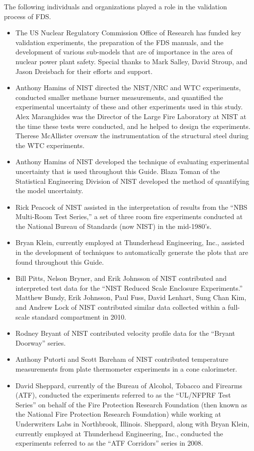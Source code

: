 \documentclass[11pt]{book}
\begin{document}
The following individuals and organizations played a role in the validation process of FDS.
\begin{itemize}
\item The US Nuclear Regulatory Commission Office of Research has funded key validation experiments, the preparation of the FDS manuals, and the development of various sub-models that are of importance in the area of nuclear power plant safety. Special thanks to Mark Salley, David Stroup, and Jason Dreisbach for their efforts and support.
\item Anthony Hamins of NIST directed the NIST/NRC and WTC experiments, conducted smaller methane burner measurements, and quantified the experimental uncertainty of these and other experiments used in this study. Alex Maranghides was the Director of the Large Fire Laboratory at NIST at the time these tests were conducted, and he helped to design the experiments. Therese McAllister oversaw the instrumentation of the structural steel during the WTC experiments.
\item Anthony Hamins of NIST developed the technique of evaluating experimental uncertainty that is used throughout this Guide. Blaza Toman of the Statistical Engineering Division of NIST developed the method of quantifying the model uncertainty.
\item Rick Peacock of NIST assisted in the interpretation of results from the ``NBS Multi-Room Test Series,'' a set of three room fire experiments conducted at the National Bureau of Standards (now NIST) in the mid-1980's.
\item Bryan Klein, currently employed at Thunderhead Engineering, Inc., assisted in the development of techniques to automatically generate the plots that are found throughout this Guide.
\item Bill Pitts, Nelson Bryner, and Erik Johnsson of NIST contributed and interpreted test data for the ``NIST Reduced Scale Enclosure Experiments.'' Matthew Bundy, Erik Johnsson, Paul Fuss, David Lenhart, Sung Chan Kim, and Andrew Lock of NIST contributed similar data collected within a full-scale standard compartment in 2010.
\item Rodney Bryant of NIST contributed velocity profile data for the ``Bryant Doorway'' series.
\item Anthony Putorti and Scott Bareham of NIST contributed temperature measurements from plate thermometer experiments in a cone calorimeter.
\item David Sheppard, currently of the Bureau of Alcohol, Tobacco and Firearms (ATF), conducted the experiments referred to as the ``UL/NFPRF Test Series'' on behalf of the Fire Protection Research Foundation (then known as the National Fire Protection Research Foundation) while working at Underwriters Labs in Northbrook, Illinois. Sheppard, along with Bryan Klein, currently employed at Thunderhead Engineering, Inc., conducted the experiments referred to as the ``ATF Corridors'' series in 2008.

\end{itemize}
\end{document}
